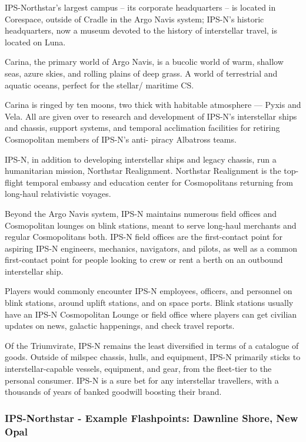 IPS-Northstar’s largest campus -- its corporate headquarters -- is located in Corespace, outside
of Cradle in the Argo Navis system; IPS-N’s historic headquarters, now a museum devoted to the
history of interstellar travel, is located on Luna.

Carina, the primary world of Argo Navis, is a bucolic world of warm, shallow seas, azure skies,
and rolling plains of deep grass. A world of terrestrial and aquatic oceans, perfect for the stellar/
maritime CS.

Carina is ringed by ten moons, two thick with habitable atmosphere — Pyxis and Vela. All are
given over to research and development of IPS-N’s interstellar ships and chassis, support
systems, and temporal acclimation facilities for retiring Cosmopolitan members of IPS-N’s anti-
piracy Albatross teams.

IPS-N, in addition to developing interstellar ships and legacy chassis, run a humanitarian
mission, Northstar Realignment. Northstar Realignment is the top-flight temporal embassy and
education center for Cosmopolitans returning from long-haul relativistic voyages.

Beyond the Argo Navis system, IPS-N maintains numerous field offices and Cosmopolitan
lounges on blink stations, meant to serve long-haul merchants and regular Cosmopolitans both.
IPS-N field offices are the first-contact point for aspiring IPS-N engineers, mechanics,
navigators, and pilots, as well as a common first-contact point for people looking to crew or rent
a berth on an outbound interstellar ship.

Players would commonly encounter IPS-N employees, officers, and personnel on blink stations,
around uplift stations, and on space ports. Blink stations usually have an IPS-N Cosmopolitan
Lounge or field office where players can get civilian updates on news, galactic happenings, and
check travel reports.

Of the Triumvirate, IPS-N remains the least diversified in terms of a catalogue of goods. Outside
of milspec chassis, hulls, and equipment, IPS-N primarily sticks to interstellar-capable vessels,
equipment, and gear, from the fleet-tier to the personal consumer. IPS-N is a sure bet for any
interstellar travellers, with a thousands of years of banked goodwill boosting their brand.

\subsubsection[Example Flashpoints: Dawnline Shore, New Opal]{IPS-Northstar - Example Flashpoints: Dawnline Shore, New Opal}


